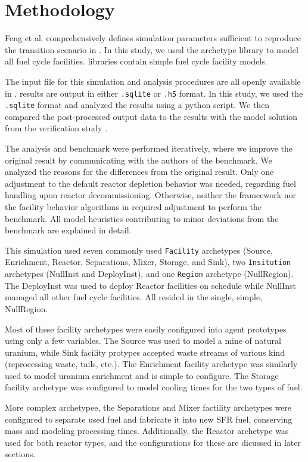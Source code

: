 \section{Methodology}

Feng et al. comprehensively defines simulation parameters
sufficient to reproduce the transition scenario in \Cyclus.
In this study, we used the \Cycamore \cite{huff_fundamental_2016}
 archetype library to model
all fuel cycle facilities. \Cycamore libraries contain
simple fuel cycle facility models. 

The \Cyclus input file for this simulation and analysis procedures are all
openly available in \cite{bae_arfc/transition-scenarios:_2018}.
\Cyclus results are output in either \texttt{.sqlite} or
\texttt{.h5} format. In this study, we used the
\texttt{.sqlite} format and analyzed the results
using a python script. We then compared the post-processed
output data to the results with the
model solution from the verification study \cite{feng_standardized_2016}.

The analysis and benchmark were performed iteratively,
where we improve the original result by communicating
with the authors of the benchmark. 
We analyzed the reasons for the differences from the original
result. Only one adjustment to the default \Cycamore reactor depletion behavior 
was needed, regarding fuel handling upon reactor decommissioning.
Otherwise, neither the \Cyclus frameework nor the facility behavior algorithms 
in \Cycamore required adjustment to perform the benchmark. All model heuristics 
contributing to minor deviations from the benchmark are explained in detail.


This simulation used seven commonly used \Cycamore \texttt{Facility} archetypes 
(Source, Enrichment, Reactor, Separations, Mixer, Storage, and Sink), two 
\texttt{Insitution} archetypes (NullInst and DeployInst), and one 
\texttt{Region} archetype (NullRegion). 
The DeployInst was used to deploy Reactor facilities on 
schedule while NullInst managed all other fuel cycle facilities. All resided in 
the single, simple, NullRegion.

Most of these facility archetypes were easily configured into agent prototypes 
using only a few variables. The Source was used to model a mine of natural 
uranium, while Sink facility protypes accepted waste streams of various kind 
(reprocessing waste, tails, etc.). The Enrichment facility archetype was 
similarly used to model uranium enrichment and is simple to configure. The 
Storage facility archetype was configured to model cooling times for the two 
types of fuel. 

More complex archetypee, the Separations and Mixer factility archetypes were 
configured to separate used fuel and fabricate it into new SFR fuel, conserving 
mass and modeling processing times. Additionally, the Reactor archetype was 
used for both reactor types, and the configurations for these are dicussed in later 
sections.
